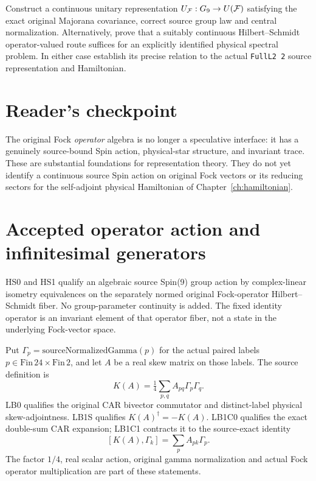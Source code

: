 \begin{openproblem}
Construct a continuous unitary representation
$U_{\mathcal F}:G_9\to U(\mathcal F)$ satisfying the exact original
Majorana covariance, correct source group law and central normalization.
Alternatively, prove that a suitably continuous Hilbert--Schmidt
operator-valued route suffices for an explicitly identified physical
spectral problem. In either case establish its precise relation to
the actual \texttt{FullL2 2} source representation and Hamiltonian.
\end{openproblem}

\section{Reader's checkpoint}
The original Fock \emph{operator} algebra is no longer a speculative
interface: it has a genuinely source-bound Spin action, physical-star
structure, and invariant trace. These are substantial foundations for
representation theory. They do not yet identify a continuous source
Spin action on original Fock vectors or its reducing sectors for the
self-adjoint physical Hamiltonian of Chapter~\ref{ch:hamiltonian}.

\section{Accepted operator action and infinitesimal generators}
\label{sec:ed08-bivectors}
HS0 and HS1 qualify an algebraic source Spin(9) group action by
complex-linear isometry equivalences on the separately normed
original Fock-operator Hilbert--Schmidt fiber. No group-parameter
continuity is added. The fixed identity operator is an invariant
element of that operator fiber, not a state in the underlying
Fock-vector space.

Put $\Gamma_p=\mathrm{sourceNormalizedGamma}(p)$ for the actual
paired labels $p\in\mathrm{Fin}\,24\times\mathrm{Fin}\,2$, and let
$A$ be a real skew matrix on those labels. The source definition is
\begin{equation}\label{eq:ed08-K}
 K(A)=\tfrac14\sum_{p,q}A_{pq}\Gamma_p\Gamma_q.
\end{equation}
LB0 qualifies the original CAR bivector commutator and distinct-label
physical skew-adjointness. LB1S qualifies $K(A)^\dagger=-K(A)$.
LB1C0 qualifies the exact double-sum CAR expansion; LB1C1 contracts
it to the source-exact identity
\begin{equation}\label{eq:ed08-Kgamma}
 [K(A),\Gamma_k]=\sum_p A_{pk}\Gamma_p.
\end{equation}
The factor $1/4$, real scalar action, original gamma normalization
and actual Fock operator multiplication are part of these statements.

